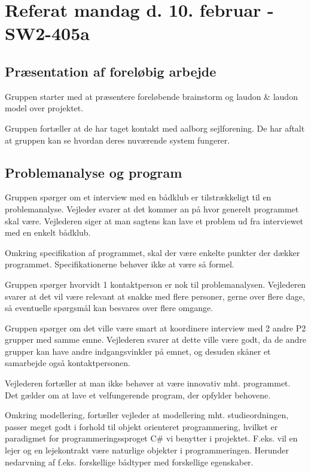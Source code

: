 \documentclass{article}
\begin{document}
\section{Referat mandag d. 10. februar - SW2-405a}

\subsection{Præsentation af foreløbig arbejde}

Gruppen starter med at præsentere foreløbende brainstorm og laudon \& laudon model over projektet.

Gruppen fortæller at de har taget kontakt med aalborg sejlforening. De har aftalt at gruppen kan se hvordan deres nuværende system fungerer. 

\subsection{Problemanalyse og program}

Gruppen spørger om et interview med en bådklub er tilstrækkeligt til en problemanalyse. Vejleder svarer at det kommer an på hvor generelt programmet skal være. Vejlederen siger at man sagtens kan lave et problem ud fra interviewet med en enkelt bådklub.

Omkring specifikation af programmet, skal der være enkelte punkter der dækker programmet. Specifikationerne behøver ikke at være så formel.

Gruppen spørger hvorvidt 1 kontaktperson er nok til problemanalysen. Vejlederen svarer at det vil være relevant at snakke med flere personer, gerne over flere dage, så eventuelle spørgsmål kan besvares over flere omgange. 

Gruppen spørger om det ville være smart at koordinere interview med 2 andre P2 grupper med samme emne. Vejlederen svarer at dette ville være godt, da de andre grupper kan have andre indgangsvinkler på emnet, og desuden skåner et samarbejde også kontaktpersonen.

Vejlederen fortæller at man ikke behøver at være innovativ mht. programmet. Det gælder om at lave et velfungerende program, der opfylder behovene.

Omkring modellering, fortæller vejleder at modellering mht. studieordningen, passer meget godt i forhold til objekt orienteret programmering, hvilket er paradigmet for programmeringssproget C\# vi benytter i projektet. F.eks. vil en lejer og en lejekontrakt være naturlige objekter i programmeringen. Herunder nedarvning af f.eks. forskellige bådtyper med forskellige egenskaber.
\end{document}
